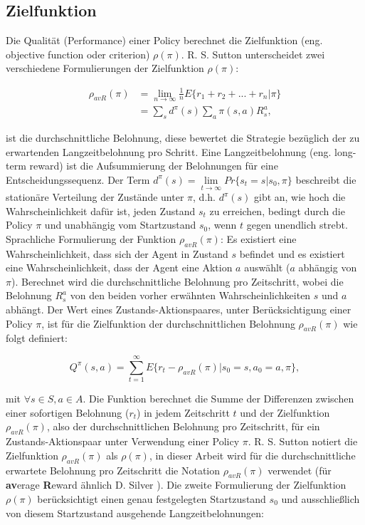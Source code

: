 \documentclass[conference]{IEEEtran}
\begin{document}
\subsection{Zielfunktion}
Die Qualität (Performance) einer Policy berechnet die Zielfunktion (eng. objective function oder criterion) $\rho(\pi)$. R. S. Sutton \cite{sutton_99} unterscheidet zwei verschiedene Formulierungen der Zielfunktion $\rho(\pi)$: 

\begin{equation*}
\begin{aligned}
\rho_{avR}(\pi) & = \lim\limits_{n \rightarrow \infty}{\frac{1}{n} E\{r_1 + r_2 + ... + r_n | \pi\}} \\
& = \sum_s d^\pi (s) \sum_a \pi(s,a) R^a_s,
\end{aligned}
\end{equation*}

ist die durchschnittliche Belohnung, diese bewertet die Strategie bezüglich der zu erwartenden Langzeitbelohnung pro Schritt. Eine Langzeitbelohnung (eng. long-term reward) ist die Aufsummierung der Belohnungen für eine Entscheidungssequenz. Der Term $d^\pi(s) = \lim\limits_{t \rightarrow \infty} Pr\{s_t = s|s_0,\pi\}$ beschreibt die stationäre Verteilung der Zustände unter $\pi$, d.h. $d^\pi(s)$ gibt an, wie hoch die Wahrscheinlichkeit dafür ist, jeden Zustand $s_t$ zu erreichen, bedingt durch die Policy $\pi$ und unabhängig vom Startzustand $s_0$, wenn $t$ gegen unendlich strebt. Sprachliche Formulierung der Funktion $\rho_{avR}(\pi)$: Es existiert eine Wahrscheinlichkeit, dass sich der Agent in Zustand $s$ befindet und es existiert eine Wahrscheinlichkeit, dass der Agent eine Aktion $a$ auswählt ($a$ abhängig von $\pi$). Berechnet wird die durchschnittliche Belohnung pro Zeitschritt, wobei die Belohnung $R^a_s$ von den beiden vorher erwähnten Wahrscheinlichkeiten $s$ und $a$ abhängt. Der Wert eines Zustands-Aktionspaares, unter Berücksichtigung einer Policy $\pi$, ist für die Zielfunktion der durchschnittlichen Belohnung $\rho_{avR}(\pi)$ wie folgt definiert:

\begin{equation*}
Q^\pi(s,a) = \sum^\infty_{t=1} E\{r_t - \rho_{avR}(\pi)|s_0 = s, a_0 = a, \pi\},
\end{equation*}

mit $\forall s \in S, a \in A$. Die Funktion berechnet die Summe der Differenzen zwischen einer sofortigen Belohnung ($r_t$) in jedem Zeitschritt $t$ und der Zielfunktion $\rho_{avR}(\pi)$, also der durchschnittlichen Belohnung pro Zeitschritt, für ein Zustands-Aktionspaar unter Verwendung einer Policy $\pi$. R. S. Sutton notiert die Zielfunktion $\rho_{avR}(\pi)$ als $\rho(\pi)$, in dieser Arbeit wird für die durchschnittliche erwartete Belohnung pro Zeitschritt die Notation $\rho_{avR}(\pi)$ verwendet (für \textbf{av}erage \textbf{R}eward ähnlich D. Silver \cite{silver_15}). Die zweite Formulierung der Zielfunktion $\rho(\pi)$ berücksichtigt einen genau festgelegten Startzustand $s_0$ und ausschließlich von diesem Startzustand ausgehende Langzeitbelohnungen:
\end{document}
